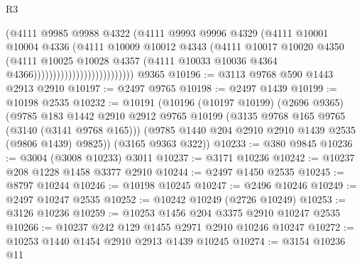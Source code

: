 \begin{lexlean}{R3}
\begin{coremodule}
                                          (@4111
                                            @9985
                                            @9988
                                            @4322
                                            (@4111
                                              @9993
                                              @9996
                                              @4329
                                              (@4111
                                                @10001
                                                @10004
                                                @4336
                                                (@4111
                                                  @10009
                                                  @10012
                                                  @4343
                                                  (@4111
                                                    @10017
                                                    @10020
                                                    @4350
                                                    (@4111
                                                      @10025
                                                      @10028
                                                      @4357
                                                      (@4111
                                                        @10033
                                                        @10036
                                                        @4364
                                                        @4366))))))))))))))))))))))))))
    @9365
@10196 := @3113 @9768 @590 @1443 @2913 @2910
@10197 := @2497 @9765
@10198 := @2497 @1439
@10199 := @10198 @2535
@10232 := @10191
    (@10196
      (@10197 @10199)
      (@2696 @9365)
      (@9785
        @183
        @1442
        @2910
        @2912
        @9765
        @10199
        (@3135 @9768 @165 @9765 (@3140 (@3141 @9768 @165)))
        (@9785 @1440 @204 @2910 @2910 @1439 @2535 (@9806 @1439) @9825))
      (@3165 @9363 @322))
@10233 := @380 @9845
@10236 := @3004 (@3008 @10233) @3011
@10237 := @3171 @10236
@10242 := @10237 @208 @1228 @1458 @3377 @2910
@10244 := @2497 @1450 @2535
@10245 := @8797 @10244
@10246 := @10198 @10245
@10247 := @2496 @10246
@10249 := @2497 @10247 @2535
@10252 := @10242 @10249 (@2726 @10249)
@10253 := @3126 @10236
@10259 := @10253 @1456 @204 @3375 @2910 @10247 @2535
@10266 := @10237 @242 @129 @1455 @2971 @2910 @10246 @10247
@10272 := @10253 @1440 @1454 @2910 @2913 @1439 @10245
@10274 := @3154 @10236 @11

\end{coremodule}
\end{lexlean}
